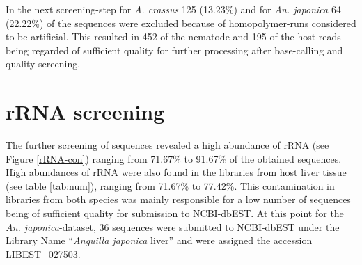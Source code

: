 In the next screening-step for \textit{A. crassus} 125 (13.23\%) and
for \textit{An. japonica} 64 (22.22\%) of the sequences were
excluded because of homopolymer-runs considered to be artificial. This
resulted in 452 of the nematode and 195 of the host reads being
regarded of sufficient quality for further processing after
base-calling and quality screening.

\section{rRNA screening}
\label{rRNA-pil}

The further screening of sequences revealed a high abundance of rRNA
(see Figure \ref{rRNA-con}) ranging from 71.67\% to 91.67\% of the
obtained sequences.  High abundances of rRNA were also found in the
libraries from host liver tissue (see table \ref{tab:num}), ranging
from 71.67\% to 77.42\%. This contamination in libraries from both
species was mainly responsible for a low number of sequences being of
sufficient quality for submission to NCBI-dbEST. At this point for the
\textit{An. japonica}-dataset, 36 sequences were submitted to
NCBI-dbEST under the Library Name ``\textit{Anguilla japonica} liver''
and were assigned the accession LIBEST\_027503.


